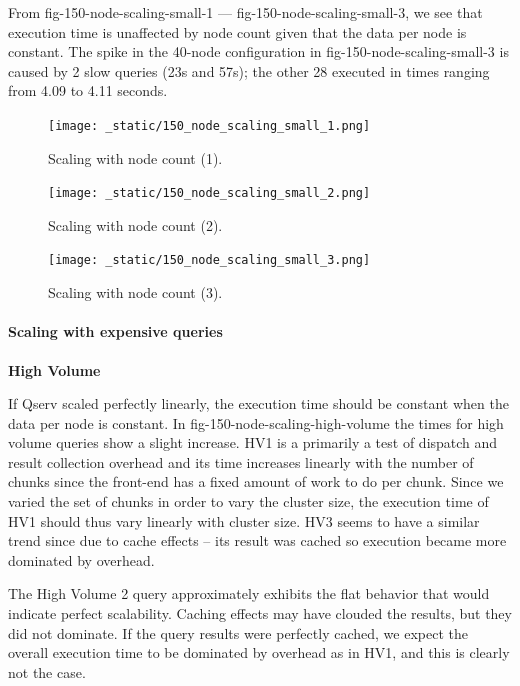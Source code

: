 \documentclass[DM,lsstdraft,toc]{lsstdoc}
\begin{document}
From fig-150-node-scaling-small-1 --- fig-150-node-scaling-small-3, we
see that execution time is unaffected by node count given that the data
per node is constant. The spike in the 40-node configuration in
fig-150-node-scaling-small-3 is caused by 2 slow queries (23s and 57s);
the other 28 executed in times ranging from 4.09 to 4.11 seconds.

\begin{figure}[H]
\centering
\texttt{[image: \_static/150\_node\_scaling\_small\_1.png]}
\caption{Scaling with node count (1).}
\end{figure}

\begin{figure}[H]
\centering
\texttt{[image: \_static/150\_node\_scaling\_small\_2.png]}
\caption{Scaling with node count (2).}
\end{figure}

\begin{figure}[H]
\centering
\texttt{[image: \_static/150\_node\_scaling\_small\_3.png]}
\caption{Scaling with node count (3).}
\end{figure}

\paragraph{Scaling with expensive
queries}\label{scaling-with-expensive-queries}

\textbf{High Volume}

If Qserv scaled perfectly linearly, the execution time should be
constant when the data per node is constant. In
fig-150-node-scaling-high-volume the times for high volume queries show
a slight increase. HV1 is a primarily a test of dispatch and result
collection overhead and its time increases linearly with the number of
chunks since the front-end has a fixed amount of work to do per chunk.
Since we varied the set of chunks in order to vary the cluster size, the
execution time of HV1 should thus vary linearly with cluster size. HV3
seems to have a similar trend since due to cache effects -- its result
was cached so execution became more dominated by overhead.

The High Volume 2 query approximately exhibits the flat behavior that
would indicate perfect scalability. Caching effects may have clouded the
results, but they did not dominate. If the query results were perfectly
cached, we expect the overall execution time to be dominated by overhead
as in HV1, and this is clearly not the case.
\end{document}
